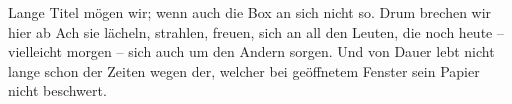 \documentclass[twocolumn]{article}
\begin{document}
    \blindtext

    \begin{definition*}{Lange Titel mögen wir; wenn auch die Box an sich nicht so. Drum brechen wir hier ab}
        Ach sie lächeln, strahlen, freuen, sich an all den Leuten,
        die noch heute -- vielleicht morgen -- sich auch um den Andern sorgen. Und von Dauer lebt nicht lange schon der Zeiten wegen
        der, welcher bei geöffnetem Fenster sein Papier nicht beschwert.
    \end{definition*}

    \blindtext

    \listofdefinitions
\end{document}
